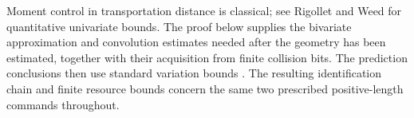 Moment control in transportation distance is classical; see
Rigollet and Weed \cite[Section~2.3, Theorem~4 and Corollary~1]{RigolletWeed}
for quantitative univariate bounds. The proof below supplies the
bivariate approximation and convolution estimates needed after the
geometry has been estimated, together with their acquisition from
finite collision bits. The prediction conclusions then use standard
variation bounds \cite{AFP,Galerne}. The resulting identification
chain and finite resource bounds concern the same two prescribed
positive-length commands throughout.
